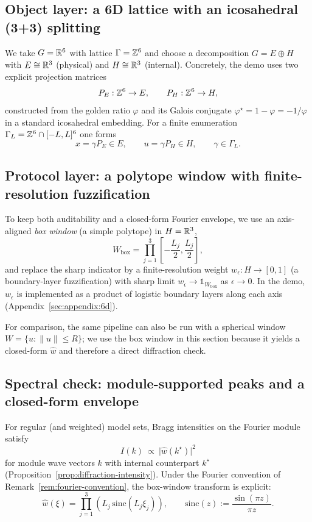 \subsection{Object layer: a 6D lattice with an icosahedral (3+3) splitting}
We take $G=\mathbb{R}^6$ with lattice $\Gamma=\mathbb{Z}^6$ and choose a decomposition $G=E\oplus H$ with $E\cong\mathbb{R}^3$ (physical) and $H\cong\mathbb{R}^3$ (internal). Concretely, the demo uses two explicit projection matrices
\[
P_E:\mathbb{Z}^6\to E,\qquad P_H:\mathbb{Z}^6\to H,
\]
constructed from the golden ratio $\varphi$ and its Galois conjugate $\varphi^\star=1-\varphi=-1/\varphi$ in a standard icosahedral embedding. For a finite enumeration $\Gamma_L=\mathbb{Z}^6\cap[-L,L]^6$ one forms
\[
x=\gamma P_E\in E,\qquad u=\gamma P_H\in H,\qquad \gamma\in\Gamma_L.
\]

\subsection{Protocol layer: a polytope window with finite-resolution fuzzification}
To keep both auditability and a closed-form Fourier envelope, we use an axis-aligned \emph{box window} (a simple polytope) in $H=\mathbb{R}^3$,
\[
W_{\mathrm{box}}=\prod_{j=1}^3\left[-\frac{L_j}{2},\frac{L_j}{2}\right],
\]
and replace the sharp indicator by a finite-resolution weight $w_\epsilon:H\to[0,1]$ (a boundary-layer fuzzification) with sharp limit $w_\epsilon\to\mathds{1}_{W_{\mathrm{box}}}$ as $\epsilon\to 0$. In the demo, $w_\epsilon$ is implemented as a product of logistic boundary layers along each axis (Appendix~\ref{sec:appendix:6d}).

For comparison, the same pipeline can also be run with a spherical window $W=\{u:\|u\|\le R\}$; we use the box window in this section because it yields a closed-form $\widehat w$ and therefore a direct diffraction check.

\subsection{Spectral check: module-supported peaks and a closed-form envelope}
For regular (and weighted) model sets, Bragg intensities on the Fourier module satisfy
\[
I(k)\ \propto\ \bigl|\widehat w(k^\star)\bigr|^2
\]
for module wave vectors $k$ with internal counterpart $k^\star$ (Proposition~\ref{prop:diffraction-intensity}). Under the Fourier convention of Remark~\ref{rem:fourier-convention}, the box-window transform is explicit:
\[
\widehat w(\xi)=\prod_{j=1}^3 \left(L_j\,\mathrm{sinc}(L_j\xi_j)\right),
\qquad
\mathrm{sinc}(z):=\frac{\sin(\pi z)}{\pi z}.
\]

